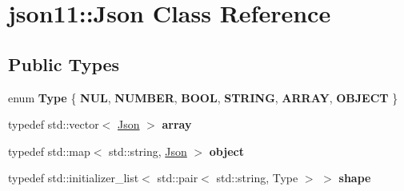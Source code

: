 \hypertarget{classjson11_1_1_json}{}\section{json11\+:\+:Json Class Reference}
\label{classjson11_1_1_json}
\subsection*{Public Types}
\begin{DoxyCompactItemize}
\item 
\mbox{\label{classjson11_1_1_json_a51a2f5c0508c32c3336bcf42ae0233e5}} 
enum {\bfseries Type} \{ \newline
{\bfseries N\+UL}, 
{\bfseries N\+U\+M\+B\+ER}, 
{\bfseries B\+O\+OL}, 
{\bfseries S\+T\+R\+I\+NG}, 
\newline
{\bfseries A\+R\+R\+AY}, 
{\bfseries O\+B\+J\+E\+CT}
 \}
\item 
\mbox{\label{classjson11_1_1_json_a49b4ee0f14b89b219955f50d272ebe5b}} 
typedef std\+::vector$<$ \mbox{\hyperlink{classjson11_1_1_json}{Json}} $>$ {\bfseries array}
\item 
\mbox{\label{classjson11_1_1_json_ac0ca9db68797b45adcd175359425590d}} 
typedef std\+::map$<$ std\+::string, \mbox{\hyperlink{classjson11_1_1_json}{Json}} $>$ {\bfseries object}
\item 
\mbox{\label{classjson11_1_1_json_ae90d6d518b325943ab2ed472efd00e83}} 
typedef std\+::initializer\+\_\+list$<$ std\+::pair$<$ std\+::string, Type $>$ $>$ {\bfseries shape}
\end{DoxyCompactItemize}
